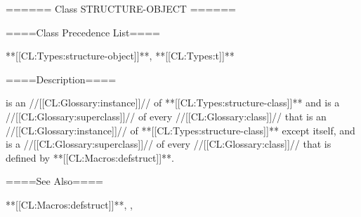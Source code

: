 ====== Class STRUCTURE-OBJECT ======

====Class Precedence List====

**[[CL:Types:structure-object]]**, **[[CL:Types:t]]**

====Description====

 is an //[[CL:Glossary:instance]]// of **[[CL:Types:structure-class]]** and is a //[[CL:Glossary:superclass]]// of every //[[CL:Glossary:class]]// that is an //[[CL:Glossary:instance]]// of **[[CL:Types:structure-class]]** except itself, and is a //[[CL:Glossary:superclass]]// of every //[[CL:Glossary:class]]// that is defined by **[[CL:Macros:defstruct]]**.

====See Also====

**[[CL:Macros:defstruct]]**, {\secref\SharpsignS}, {\secref\PrintingStructures}

 
